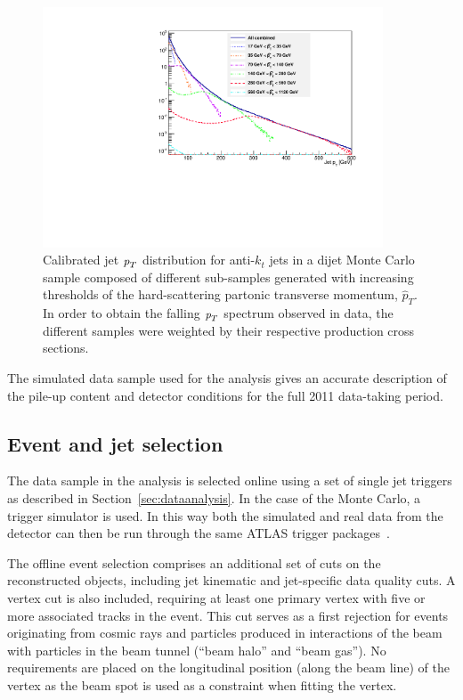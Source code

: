 \begin{figure}[tp]
\centering
\includegraphics[width=0.9\textwidth]{JXspectrum.pdf}
\caption{Calibrated jet ${\emph{p}_{T}}$ distribution for anti-$k_t$ jets in a dijet Monte Carlo sample composed of different sub-samples generated with increasing thresholds of the hard-scattering partonic transverse momentum, $\hat{p}_T$. In order to obtain the falling ${\emph{p}_{T}}$ spectrum observed in data, the different samples were weighted by their respective production cross sections.}
\label{fig:JXpt}
\end{figure}




The simulated data sample used for the analysis %
gives an accurate description of the pile-up content and detector conditions for the full 2011 data-taking period. 



\subsection{Event and jet selection}\label{sec:EventSelection}

The data sample in the analysis is selected online using a set of single jet triggers as described in Section~\ref{sec:dataanalysis}. In the case of the Monte Carlo, a trigger simulator is used. In this way both the simulated and real data from the detector can then be run through the same ATLAS trigger packages~\cite{ATLASTriggerSimulation}.

The offline event selection comprises an additional set of cuts on the reconstructed objects, including jet kinematic and jet-specific data quality cuts. A vertex cut is also included, requiring at least one primary vertex with five or more associated tracks in the event.  This cut serves as a first rejection for events originating from cosmic rays and particles produced in interactions of the beam with particles in the beam tunnel (``beam halo'' and ``beam gas'').
No requirements are placed on the longitudinal position (along the beam line) of the vertex as the beam spot is used as a constraint when fitting the vertex. 


